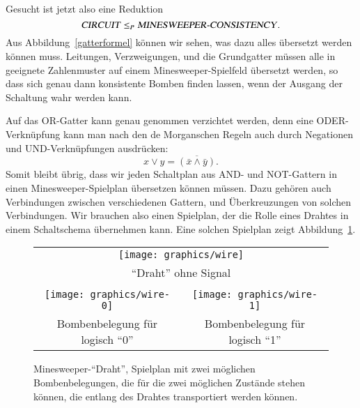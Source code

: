 Gesucht ist jetzt also eine Reduktion 
\[
\text{\textsl{CIRCUIT}} \le_P \text{\textsl{MINESWEEPER-CONSISTENCY}}.
\]
Aus Abbildung~\ref{gatterformel} können wir sehen, was dazu alles
übersetzt werden können muss.
Leitungen, Verzweigungen, und die Grundgatter
müssen alle in geeignete Zahlenmuster auf einem Minesweeper-Spielfeld
übersetzt werden, so dass sich genau dann konsistente Bomben
finden lassen, wenn der Ausgang der Schaltung wahr werden kann.

Auf das OR-Gatter kann genau genommen verzichtet werden, denn eine
ODER-Verknüpfung kann man nach den de Morganschen Regeln auch durch
Negationen und UND-Verknüpfungen ausdrücken:
\[
x\vee y = \overline{(\bar x \wedge \bar y)}.
\]
Somit bleibt übrig, dass wir jeden Schaltplan aus AND- und NOT-Gattern
in einen Minesweeper-Spielplan übersetzen können müssen.
Dazu gehören
auch Verbindungen zwischen verschiedenen Gattern, und Überkreuzungen von
solchen Verbindungen.
Wir brauchen also einen Spielplan, der die Rolle
eines Drahtes in einem Schaltschema übernehmen kann.
Eine solchen Spielplan
zeigt Abbildung~\ref{minesweeper-wire}.

\begin{figure}
\begin{center}
\begin{tabular}{cc}
\multicolumn{2}{c}{\texttt{[image: graphics/wire]}}\\
\multicolumn{2}{c}{``Draht'' ohne Signal}\\
&\\
\texttt{[image: graphics/wire-0]}&
\texttt{[image: graphics/wire-1]}\\
Bombenbelegung für logisch ``0''&
Bombenbelegung für logisch ``1''
\end{tabular}
\end{center}
\caption{Minesweeper-``Draht'', Spielplan mit zwei möglichen Bombenbelegungen,
die für die zwei möglichen Zustände stehen können, die entlang des
Drahtes transportiert werden können.\label{minesweeper-wire}}
\end{figure}%

